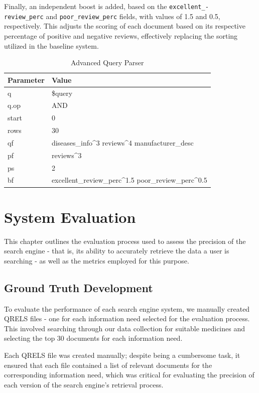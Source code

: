 \documentclass[sigconf]{acmart}
\begin{document}
Finally, an independent boost is added, based on the \texttt{excellent\_-\\review\_perc} and \texttt{poor\_review\_perc} fields, with values of 1.5 and 0.5, respectively. This adjusts the scoring of each document based on its respective percentage of positive and negative reviews, effectively replacing the sorting utilized in the baseline system.

\begin{table}[H]
    \begin{tabular}{ll}
    \toprule
    Parameter & Value\\
    \midrule
    q & \$query\\
    q.op & AND\\
    start & 0\\
    rows & 30\\
    qf & diseases\_info\^{}3 reviews\^{}4 manufacturer\_desc\\
    pf & reviews\^{}3\\
    ps & 2\\
    bf & excellent\_review\_perc\^{}1.5 poor\_review\_perc\^{}0.5\\
    \bottomrule
    \end{tabular}
    \caption{Advanced Query Parser}
    \label{tab:advanced_query}
\end{table}

\section{System Evaluation}

This chapter outlines the evaluation process used to assess the precision of the search engine - that is, its ability to accurately retrieve the data a user is searching - as well as the metrics employed for this purpose.

\subsection{Ground Truth Development}

To evaluate the performance of each search engine system, we manually created QRELS\cite{qrels} files - one for each information need selected for the evaluation process. This involved searching through our data collection for suitable medicines and selecting the top 30 documents for each information need.

Each QRELS file was created manually; despite being a cumbersome task, it ensured that each file contained a list of relevant documents for the corresponding information need, which was critical for evaluating the precision of each version of the search engine's retrieval process.
\end{document}
